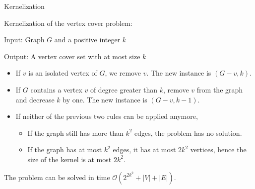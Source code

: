 \documentclass{beamer}
\begin{document}
\begin{frame}{Kernelization}
\begin{example}
Kernelization of the vertex cover problem:

Input: Graph $G$ and a positive integer $k$ 

Output: A vertex cover set with at most size $k$
 

\begin{itemize}
\item If $v$ is an isolated vertex of $G$, we remove $v$. The new instance is $(G - v , k)$.

 
\item If $G$ contains a vertex $v$ of degree greater than $k$, remove $v$ from the graph and decrease $k$ by one. The new instance is $(G - v , k - 1)$.
 
\item If neither of the previous two rules can be applied anymore,
 
\begin{itemize}
\item If the graph still has more than $k^2$ edges, the problem has no solution.
 
\item If the graph has at most $k^2$ edges, it has at most $2 k^2$ vertices, hence the size of the kernel is at most $2 k^2$.
\end{itemize}

  
\end{itemize}


 
The problem can be solved in time $\mathcal{O}(2^{2k^2} + |V| + |E|)$.
\end{example}
\end{frame}
\end{document}
